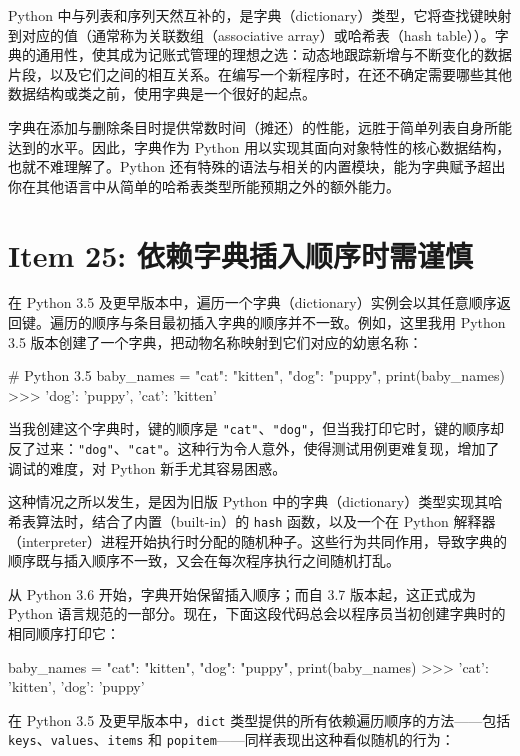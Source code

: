 Python 中与列表和序列天然互补的，是字典（dictionary）类型，它将查找键映射到对应的值（通常称为关联数组（associative array）或哈希表（hash table））。字典的通用性，使其成为记账式管理的理想之选：动态地跟踪新增与不断变化的数据片段，以及它们之间的相互关系。在编写一个新程序时，在还不确定需要哪些其他数据结构或类之前，使用字典是一个很好的起点。

字典在添加与删除条目时提供常数时间（摊还）的性能，远胜于简单列表自身所能达到的水平。因此，字典作为 Python 用以实现其面向对象特性的核心数据结构，也就不难理解了。Python 还有特殊的语法与相关的内置模块，能为字典赋予超出你在其他语言中从简单的哈希表类型所能预期之外的额外能力。

\section{Item 25: 依赖字典插入顺序时需谨慎}

在 Python 3.5 及更早版本中，遍历一个字典（dictionary）实例会以其任意顺序返回键。遍历的顺序与条目最初插入字典的顺序并不一致。例如，这里我用 Python 3.5 版本创建了一个字典，把动物名称映射到它们对应的幼崽名称：

\begin{codebox}[python]
# Python 3.5
baby_names = {
    "cat": "kitten",
    "dog": "puppy",
}
print(baby_names)
>>>
{'dog': 'puppy', 'cat': 'kitten'}
\end{codebox}

当我创建这个字典时，键的顺序是 \texttt{"cat"}、\texttt{"dog"}，但当我打印它时，键的顺序却反了过来：\texttt{"dog"}、\texttt{"cat"}。这种行为令人意外，使得测试用例更难复现，增加了调试的难度，对 Python 新手尤其容易困惑。

这种情况之所以发生，是因为旧版 Python 中的字典（dictionary）类型实现其哈希表算法时，结合了内置（built-in）的 \texttt{hash} 函数，以及一个在 Python 解释器（interpreter）进程开始执行时分配的随机种子。这些行为共同作用，导致字典的顺序既与插入顺序不一致，又会在每次程序执行之间随机打乱。

从 Python 3.6 开始，字典开始保留插入顺序；而自 3.7 版本起，这正式成为 Python 语言规范的一部分。现在，下面这段代码总会以程序员当初创建字典时的相同顺序打印它：

\begin{codebox}[python]
baby_names = {
    "cat": "kitten",
    "dog": "puppy",
}
print(baby_names)
>>>
{'cat': 'kitten', 'dog': 'puppy'}
\end{codebox}

在 Python 3.5 及更早版本中，\texttt{dict} 类型提供的所有依赖遍历顺序的方法——包括 \texttt{keys}、\texttt{values}、\texttt{items} 和 \texttt{popitem}——同样表现出这种看似随机的行为：

